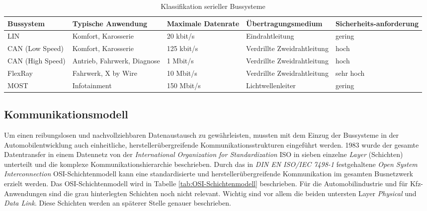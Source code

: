 \begin{table}[!htbp]
	\centering
	\caption{Klassifikation serieller Bussysteme \cite{VectorInformatikGmbH.b}}
	\renewcommand{\arraystretch}{1.3}
	\begin{tabulary}{\columnwidth}{L L L L L}
		\toprule
		Bussystem        & Typische Anwendung           & Maximale Datenrate & Übertragungsmedium          & Sicherheits-anforderung \\ \midrule
		LIN              & Komfort, Karosserie          & 20 kbit/s          & Eindrahtleitung             & gering                  \\
		CAN (Low Speed)  & Komfort, Karosserie          & 125 kbit/s         & Verdrillte Zweidrahtleitung & hoch                    \\
		CAN (High Speed) & Antrieb, Fahrwerk, Diagnose  & 1 Mbit/s           & Verdrillte Zweidrahtleitung & hoch                    \\
		FlexRay          & Fahrwerk, \newline X by Wire & 10 Mbit/s          & Verdrillte Zweidrahtleitung & sehr hoch               \\
		MOST             & Infotainment                 & 150 Mbit/s         & Lichtwellenleiter           & gering                  \\ \bottomrule
	\end{tabulary}

	\label{tab:KlassifikationSerielleBussysteme}
\end{table}



\subsection{Kommunikationsmodell} \label{subsec:Kommunikationsmodell}
Um einen reibungslosen und nachvollziehbaren Datenaustausch zu gewährleisten, mussten mit dem Einzug der Bussysteme in der Automobilentwicklung auch einheitliche, herstellerübergreifende Kommunikationsstrukturen eingeführt werden. 1983 wurde der gesamte Datentransfer in einem Datennetz von der \emph{International Organization for Standardization} \acs{ISO} in sieben einzelne \emph{Layer} (Schichten) unterteilt und die komplexe Kommunikationshierarchie beschrieben. Durch das in \emph{DIN EN ISO/IEC 7498-1} \cite{InternationalOrganizationforStandardization.15.11.1994} festgehaltene \emph{Open System Interconnection} \acs{OSI}-Schichtenmodell kann eine standardisierte und herstellerübergreifende Kommunikation im gesamten Busnetzwerk erzielt werden. Das OSI-Schichtenmodell wird in Tabelle \ref{tab:OSI-Schichtenmodell} beschrieben. Für die Automobilindustrie und für Kfz-Anwendungen sind die grau hinterlegten Schichten noch nicht relevant. Wichtig sind vor allem die beiden untersten Layer \emph{Physical} und \emph{Data Link}. Diese Schichten werden an späterer Stelle genauer beschrieben. 

